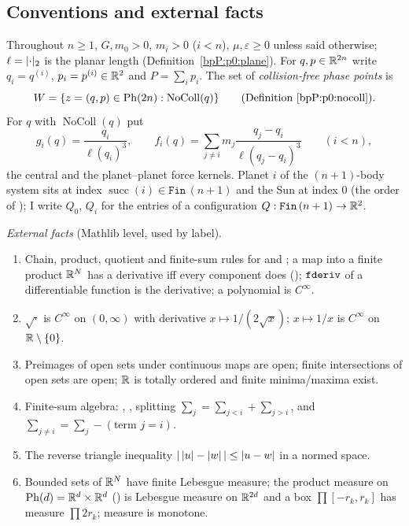 \subsection{Conventions and external facts}\label{bpP:p6:conv}

Throughout $n\ge1$, $G,m_0>0$, $m_i>0$ ($i<n$), $\mu,\varepsilon\ge0$ unless said otherwise; $\ell=\lvert \cdot\rvert_2$ is the planar length (Definition~\ref{bpP:p0:plane}). For $q,p\in\mathbb{R}^{2n}$ write $q_i=q^{(i)}$, $p_i=p^{(i)}\in\mathbb{R}^2$ and $P=\sum_ip_i$. The set of \emph{collision-free phase points} is
\[W=\{z=(q,p)\in\mathrm{Ph}(2n):\operatorname{NoColl}(q)\}\qquad(\text{Definition~\ref{bpP:p0:nocoll}}).\]
For $q$ with $\operatorname{NoColl}(q)$ put
\[g_i(q)=\frac{q_i}{\ell(q_i)^3},\qquad f_i(q)=\sum_{j\ne i}m_j\frac{q_j-q_i}{\ell(q_j-q_i)^3}\qquad(i<n),\]
the central and the planet--planet force kernels. Planet $i$ of the $(n+1)$-body system sits at index $\operatorname{succ}(i)\in\texttt{Fin}\,(n+1)$ and the Sun at index $0$ (the order of ); I write $Q_0$, $Q_i$ for the entries of a configuration $Q:\texttt{Fin}\,(n+1)\to\mathbb{R}^2$.

\emph{External facts} (Mathlib level, used by label).
\begin{enumerate}[label=(E\arabic*)]
\item\label{bpP:p6:ext-chain} Chain, product, quotient and finite-sum rules for  and ; a map into a finite product $\mathbb{R}^N$ has a derivative iff every component does (); $\texttt{fderiv}$ of a differentiable function is the derivative; a polynomial is $C^\infty$.
\item\label{bpP:p6:ext-sqrt} $\sqrt{\cdot}$ is $C^\infty$ on $(0,\infty)$ with derivative $x\mapsto1/(2\sqrt x)$; $x\mapsto1/x$ is $C^\infty$ on $\mathbb{R}\setminus\{0\}$.
\item\label{bpP:p6:ext-top} Preimages of open sets under continuous maps are open; finite intersections of open sets are open; $\mathbb{R}$ is totally ordered and finite minima/maxima exist.
\item\label{bpP:p6:ext-sum} Finite-sum algebra: , , splitting $\sum_{j}=\sum_{j<i}+\sum_{j>i}$, and $\sum_{j\ne i}=\sum_j-(\text{term }j=i)$.
\item\label{bpP:p6:ext-tri} The reverse triangle inequality $\lvert \,\lvert u\rvert-\lvert w\rvert\,\rvert\le\lvert u-w\rvert$ in a normed space.
\item\label{bpP:p6:ext-meas} Bounded sets of $\mathbb{R}^N$ have finite Lebesgue measure; the product measure on $\mathrm{Ph}(d)=\mathbb{R}^d\times\mathbb{R}^d$ () is Lebesgue measure on $\mathbb{R}^{2d}$ and a box $\prod[-r_k,r_k]$ has measure $\prod2r_k$; measure is monotone.
\end{enumerate}


